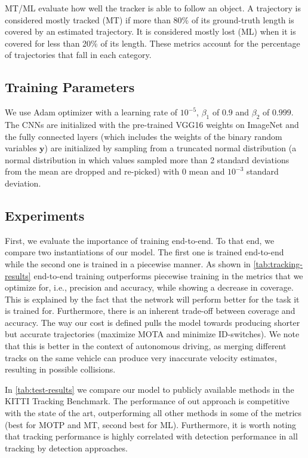 \documentclass[letterpaper, 10 pt, conference]{ieeeconf}  \pdfminorversion=4
\newcommand{\binvarset}{\mathbf{y}}
\begin{document}
MT/ML evaluate how well the tracker is able to follow an object. A trajectory is considered mostly tracked (MT) if more than 80\% of its ground-truth length is covered by an estimated trajectory. It is considered mostly lost (ML) when it is covered for less than 20\% of its length. These metrics account for the percentage of trajectories that fall in each category.

\subsection{Training Parameters}

We use Adam optimizer \cite{kingma2014adam} with a learning rate of $10^{-5}$, $\beta_1$ of $0.9$ and $\beta_2$ of $0.999$. The CNNs are initialized with the pre-trained VGG16 weights on ImageNet and the fully connected layers (which includes the weights of the binary random variables $\binvarset$) are initialized by sampling from a truncated normal distribution (a normal distribution in which values sampled more than 2 standard deviations from the mean are dropped and re-picked) with 0 mean and $10^{-3}$ standard deviation.

\subsection{Experiments}



\vspace{0.1cm}
First, we evaluate the importance of training  end-to-end. To that end, we compare two instantiations of our model. The first one is trained end-to-end while the second one is trained in a piecewise manner. As shown in  \autoref{tab:tracking-results} end-to-end training  outperforms  piecewise training in the metrics that we optimize for,  i.e., precision and accuracy, while showing a decrease in coverage. This is explained by the fact that the network will perform better for the task it is trained for. Furthermore, there is an inherent trade-off between coverage and accuracy. The way our cost is defined pulls the model towards producing shorter but accurate trajectories (maximize MOTA and minimize ID-switches). We note that this is better in the context of autonomous driving, as merging different tracks on the same vehicle can produce very inaccurate velocity estimates, resulting in possible collisions.

\vspace{0.1cm}
In \autoref{tab:test-results} we compare our model to publicly available methods in the KITTI Tracking Benchmark. The performance of out approach is competitive with the state of the art, outperforming all other methods in some of the metrics (best for MOTP and MT, second best for ML). Furthermore, it is worth noting that tracking performance is highly correlated with detection performance in all  tracking by detection approaches.
\end{document}
